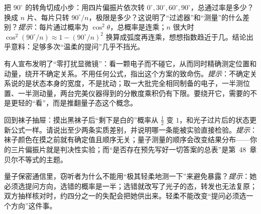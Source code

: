 \begin{puzzles}
\item 把 $90^\circ$ 的转角切成小步：用四片偏振片依次转 $0^\circ,30^\circ,60^\circ,90^\circ$，总通过率是多少？换成 $n$ 片、每片只转 $90^\circ/n$，极限是多少？这说明了“过滤器”和“测量”的什么差别？\emph{提示}：每片通过概率为 $\cos^2\theta$，总概率是连乘；$n$ 很大时 $\cos^2(90^\circ/n)\approx1-(90^\circ/n)^2$ 换算成弧度再连乘，想想指数趋近于几。结论出乎意料：足够多次“温柔的提问”几乎不挡光。
\item 有人宣布发明了“零打扰显微镜”：看一颗电子而不碰它，从而同时精确测定位置和动量，绕开不确定关系。不用任何公式，指出这个方案的致命伤。\emph{提示}：不确定关系说的是状态本身的宽度，不是扰动；取一大批完全相同制备的电子，一半测位置、一半测动量，两台完美仪器得到的分散度乘积仍有下限。要绕开它，需要的不是更轻的“看”，而是推翻量子态这个概念。
\item 回到袜子抽屉：摸出黑袜子后“剩下是白的”概率从 $\tfrac12$ 变 $1$，和光子过片后的状态更新公式一样。请说出至少两条实质差别，并说明哪一条能被实验直接检验。\emph{提示}：袜子颜色在摸之前就有确定值且顺序无关；量子测量的顺序会改变结果分布——你的三片偏振片就是判决性实验；而“是否存在预先写好一切答案的总表”是第~48~章贝尔不等式的主题。
\item 量子保密通信里，窃听者为什么不能用“极其轻柔地测一下”来避免暴露？\emph{提示}：她必须选提问方向，选错的概率是一半；选错就改写了光子的态，转发也无法复原；双方抽样核对时，约四分之一的失配会把她供出来。轻柔不能改变“提问必须选一个方向”这件事。
\end{puzzles}
